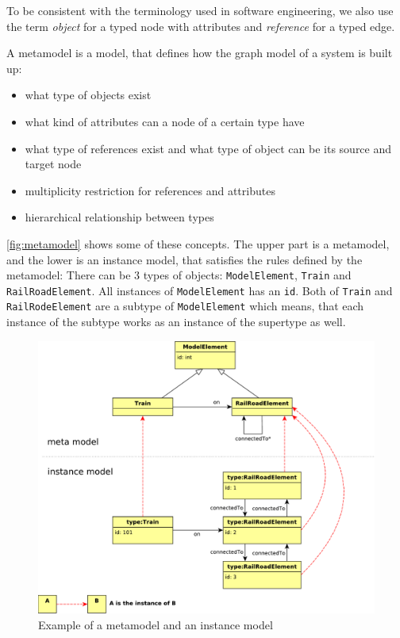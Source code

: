 To be consistent with the terminology used in software engineering, we also use the term \emph{object} for a typed node with attributes and \emph{reference} for a typed edge. 

A metamodel is a model, that defines how the graph model of a system is built up:
\begin{itemize}
	\item what type of objects exist
	\item what kind of attributes can a node of a certain type have
	\item what type of references exist and what type of object can be its source and target node
	\item multiplicity restriction for references and attributes
	\item hierarchical relationship between types
\end{itemize}

\autoref{fig:metamodel} shows some of these concepts. The upper part is a metamodel, and the lower is an instance model, that satisfies the rules defined by the metamodel: There can be 3 types of objects: \texttt{ModelElement}, \texttt{Train} and \texttt{RailRoadElement}. All instances of \texttt{ModelElement} has an \texttt{id}. Both of \texttt{Train} and \texttt{RailRodeElement} are a subtype of \texttt{ModelElement} which means, that each instance of the subtype works as an instance of the supertype as well.
\begin{figure}[h]
	\begin{center}
		\includegraphics[width=\textwidth]{figures/metamodel.pdf}
		\caption{ Example of a metamodel and an instance model }
		\label{fig:metamodel}
	\end{center}
\end{figure}


